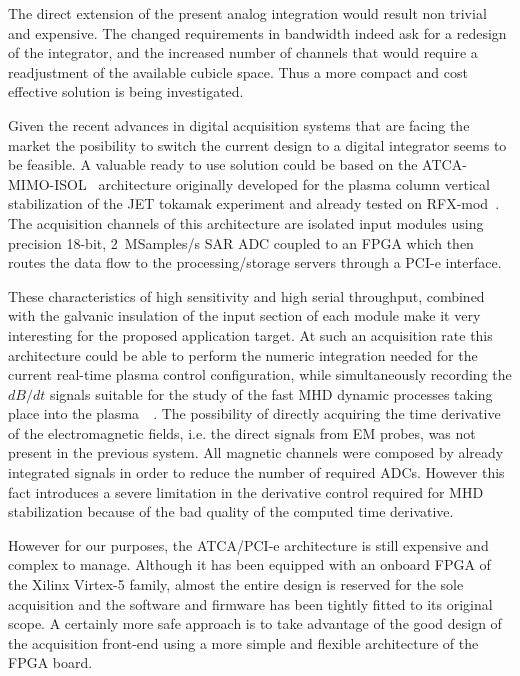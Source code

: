 The direct extension of the present analog integration would result non trivial and expensive. The changed requirements in bandwidth indeed ask for a redesign of the integrator, and the increased number of channels that would require a readjustment of the available cubicle space.
Thus a more compact and cost effective solution is being investigated. 

Given the recent advances in digital acquisition systems that are facing the market the posibility to switch the current design to a digital integrator seems to be feasible. A valuable ready to use solution could be based on the ATCA-MIMO-ISOL~\cite{carvalho2010reconfigurable} architecture originally developed for the plasma column vertical stabilization of the JET tokamak experiment and already tested on RFX-mod~\cite{manduchi2012upgrade}. 
The acquisition channels of this architecture are isolated input modules using precision 18-bit, 2~MSamples/s SAR ADC coupled to an FPGA which then routes the data flow to the processing/storage servers through a PCI-e interface.

These characteristics of high sensitivity and high serial throughput, combined with the galvanic insulation of the input section of each module make it very interesting for the proposed application target.
At such an acquisition rate this architecture could be able to perform the numeric integration needed for the current real-time plasma control configuration, while simultaneously recording the $dB/dt$ signals suitable for the study of the fast MHD dynamic processes taking place into the plasma~\cite{zuin2009current}~\cite{innocente2014tearing}. 
The possibility of directly acquiring the time derivative of the electromagnetic fields, i.e. the direct signals from EM probes, was not present in the previous system. All magnetic channels were composed by already integrated signals in order to reduce the number of required ADCs. However this fact introduces a severe limitation in the derivative control required for MHD stabilization because of the bad quality of the computed time derivative.

However for our purposes, the ATCA/PCI-e architecture is still expensive and complex to manage. Although it has been equipped with an onboard FPGA of the Xilinx Virtex-5 family, almost the entire design is reserved for the sole acquisition and the software and firmware has been tightly fitted to its original scope. A certainly more safe approach is to take advantage of the good design of the acquisition front-end using a more simple and flexible architecture of the FPGA board. 

